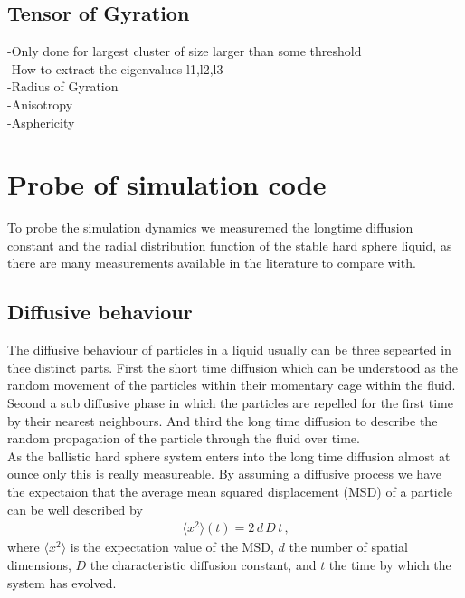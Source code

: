 \subsection{Tensor of Gyration}
\label{sec:ToG}
-Only done for largest cluster of size larger than some threshold\\
-How to extract the eigenvalues l1,l2,l3\\
-Radius of Gyration\\
-Anisotropy\\
-Asphericity\\








\section{Probe of simulation code}
\label{sec:probe}
To probe the simulation dynamics we measuremed the longtime diffusion constant and the radial distribution function of the stable hard sphere liquid, as there are many measurements available in the literature to compare with.

\subsection{Diffusive behaviour}
\label{sec:diffusion_probe}
The diffusive behaviour of particles in a liquid usually can be three sepearted in thee distinct parts. First the short time diffusion which can be understood as the random movement of the particles within their momentary cage within the fluid. Second a sub diffusive phase in which the particles are repelled for the first time by their nearest neighbours. And third the long time diffusion to describe the random propagation of the particle through the fluid over time.\\
   
As the ballistic hard sphere system enters into the long time diffusion almost at ounce only this is really measureable. By assuming a diffusive process we have the expectaion that the average mean squared displacement (MSD) of a particle can be well described by 
\begin{align}
\label{eqn:diffusion}
\langle x^2 \rangle(t) = 2 \, d \, D \, t  \, \text{,}
\end{align}
where $\langle x^2 \rangle$ is the expectation value of the MSD, $d$ the number of spatial dimensions, $D$ the characteristic diffusion constant, and $t$ the time by which the system has evolved.\\

